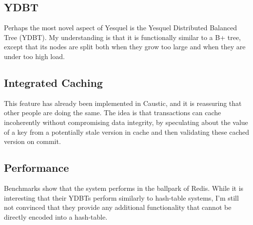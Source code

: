 \documentclass[12pt]{article}
\begin{document}
  \subsection{YDBT}
  Perhaps the most novel aspect of Yesquel is the Yesquel Distributed Balanced Tree (YDBT). My
  understanding is that it is functionally similar to a B+ tree, except that its nodes are split
  both when they grow too large and when they are under too high load.

  \subsection{Integrated Caching}
  This feature has already been implemented in Caustic, and it is reassuring that other people are
  doing the same. The idea is that transactions can cache incoherently without compromising data
  integrity, by speculating about the value of a key from a potentially stale version in cache and
  then validating these cached version on commit.
  
  \subsection{Performance}
  Benchmarks show that the system performs in the ballpark of Redis. While it is interesting that 
  their YDBTs perform similarly to hash-table systems, I'm still not convinced that they provide any
  additional functionality that cannot be directly encoded into a hash-table.
\end{document}
